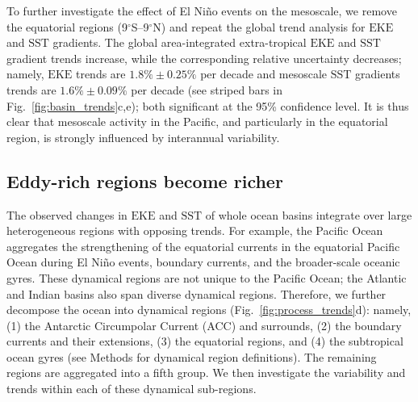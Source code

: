 \documentclass{nature}
\newcommand{\EKE}{\text{EKE}}
\newcommand{\SST}{\text{SST}}
\begin{document}
To further investigate the effect of El Ni\~no events on the mesoscale, we remove the equatorial regions (9$^\circ$S--9$^\circ$N) and repeat the global trend analysis for $\EKE$ and $\SST$ gradients. The global area-integrated extra-tropical $\EKE$ and $\SST$ gradient trends increase, while the corresponding relative uncertainty decreases; namely, $\EKE$ trends are $1.8\% \pm 0.25 \%$ per decade and mesoscale $\SST$ gradients trends are $1.6\% \pm 0.09 \%$ per decade (see striped bars in Fig.~\ref{fig:basin_trends}c,e); both significant at the 95\% confidence level. It is thus clear that mesoscale activity in the Pacific, and particularly in the equatorial region, is strongly influenced by interannual variability. 

\subsection{Eddy-rich regions become richer}\mbox{}\vspace{-1.5em}

The observed changes in $\EKE$ and $\SST$ of whole ocean basins integrate over large heterogeneous regions with opposing trends. For example, the Pacific Ocean aggregates the strengthening of the equatorial currents in the equatorial Pacific Ocean during El Ni\~no events, boundary currents, and the broader-scale oceanic gyres. These dynamical regions are not unique to the Pacific Ocean; the Atlantic and Indian basins also span diverse dynamical regions. Therefore, we further decompose the ocean into dynamical regions (Fig.~\ref{fig:process_trends}d): namely, (1) the Antarctic Circumpolar Current (ACC) and surrounds, (2) the boundary currents and their extensions, (3) the equatorial regions, and (4) the subtropical ocean gyres (see Methods for dynamical region definitions). The remaining regions are aggregated into a fifth group. We then investigate the variability and trends within each of these dynamical sub-regions.
\end{document}
